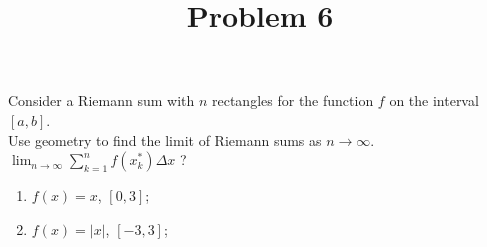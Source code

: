 \documentclass{ximera}
\title[Problem 6]{Problem 6}
\begin{document}
\begin{abstract} \end{abstract}
\maketitle

\begin{problem}
Consider  a  Riemann sum with $n$ rectangles for the  function $f$ on the interval $[a,b]$.\\
Use geometry to find the limit of Riemann sums as $n\to\infty$.\\
$\displaystyle \lim_{n\to\infty} \displaystyle \sum_{k=1}^{n}  f ( x_k^* ) \Delta x $ ?
\begin{enumerate}
\item $f(x)=x$, $[0,3]$;\\
	
\item $f(x)=|x|$, $[-3,3]$;
	
\end{enumerate}
\end{problem}
\end{document}
